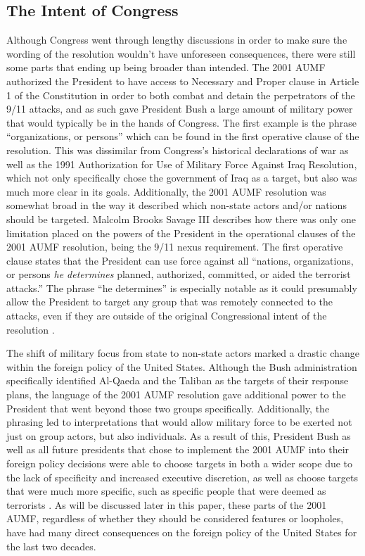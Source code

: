 \documentclass[12pt]{article}
\begin{document}
\subsection*{The Intent of Congress}
Although Congress went through lengthy discussions in order to make sure the wording of the resolution wouldn't have unforeseen consequences, there were still some parts that ending up being broader than intended.
The 2001 AUMF authorized the President to have access to Necessary and Proper clause in Article 1 of the Constitution in order to both combat and detain the perpetrators of the 9/11 attacks, and as such gave President Bush a large amount of military power that would typically be in the hands of Congress.
The first example is the phrase ``organizations, or persons'' which can be found in the first operative clause of the resolution.
This was dissimilar from Congress's historical declarations of war as well as the 1991 Authorization for Use of Military Force Against Iraq Resolution, which not only specifically chose the government of Iraq as a target, but also was much more clear in its goals.
Additionally, the 2001 AUMF resolution was somewhat broad in the way it described which non-state actors and/or nations should be targeted.
Malcolm Brooks Savage III describes how there was only one limitation placed on the powers of the President in the operational clauses of the 2001 AUMF resolution, being the 9/11 nexus requirement.
The first operative clause states that the President can use force against all ``nations, organizations, or persons \emph{he determines} planned, authorized, committed, or aided the terrorist attacks.''
The phrase ``he determines'' is especially notable as it could presumably allow the President to target any group that was remotely connected to the attacks, even if they are outside of the original Congressional intent of the resolution \autocite[5]{savage2015}.

The shift of military focus from state to non-state actors marked a drastic change within the foreign policy of the United States.
Although the Bush administration specifically identified Al-Qaeda and the Taliban as the targets of their response plans, the language of the 2001 AUMF resolution gave additional power to the President that went beyond those two groups specifically.
Additionally, the phrasing led to interpretations that would allow military force to be exerted not just on group actors, but also individuals.
As a result of this, President Bush as well as all future presidents that chose to implement the 2001 AUMF into their foreign policy decisions were able to choose targets in both a wider scope due to the lack of specificity and increased executive discretion, as well as choose targets that were much more specific, such as specific people that were deemed as terrorists \autocite[3]{weed2015}.
As will be discussed later in this paper, these parts of the 2001 AUMF, regardless of whether they should be considered features or loopholes, have had many direct consequences on the foreign policy of the United States for the last two decades.
\end{document}
